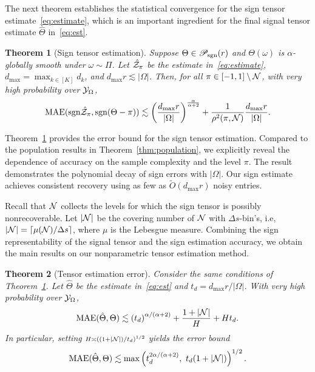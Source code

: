 \documentclass[useAMS,usenatbib,usegraphicx,referee]{biom}
\theoremstyle{plain}
\newtheorem{thm}{Theorem}
\theoremstyle{definition}
\def\sign{\textup{sgn}}
\def\caliP{\mathscr{P}_{\textup{sgn}}}
\begin{document}
The next theorem establishes the statistical convergence for the sign tensor estimate~\eqref{eq:estimate}, which is an important ingredient for the final signal tensor estimate $\hat \Theta$ in~\eqref{eq:est}. 

\vspace{-.3cm}
 \begin{thm}[Sign tensor estimation]\label{thm:classification} Suppose $\Theta\in\caliP(r)$ and $\Theta(\omega)$ is $\alpha$-globally smooth under $\omega\sim \Pi$. Let $\hat {\mathcal{Z}}_\pi$ be the estimate in~\eqref{eq:estimate}, $d_{\max}=\max_{k\in[K]} d_k$, and $d_{\max}r\lesssim |\Omega|$. Then, for all $\pi\in[-1,1]\setminus\mathcal{N}$, with very high probability over $\mathcal{Y}_\Omega$, 
\begin{align}\label{eq:bound}
\textup{MAE}(\sign \hat \tZ_\pi, \sign(\Theta-\pi)) \lesssim  \left({d_{\max} r\over |\Omega|}\right)^{\alpha\over \alpha+2}+{1 \over \rho^2(\pi, \tN)} {d_{\max}r \over |\Omega|}.
\end{align}
\end{thm}
Theorem~\ref{thm:classification} provides the error bound for the sign tensor estimation. Compared to the population results in Theorem~\ref{thm:population}, we explicitly reveal the dependence of accuracy on the sample complexity and the level $\pi$. The result demonstrates the polynomial decay of sign errors with $|\Omega|$.  Our sign estimate achieves consistent recovery using as few as $\tilde O(d_{\max}r)$ noisy entries. 

Recall that $\mathcal{N}$ collects the levels for which the sign tensor is possibly nonrecoverable. Let $|\mathcal{N}|$ be the covering number of $\mathcal{N}$ with $\Delta s$-bin's, i.e, $|\mathcal{N}| = \lceil \mu(\mathcal{N})/\Delta s \rceil$, where $\mu$ is the Lebesgue measure. Combining the sign representability of the signal tensor and the sign estimation accuracy, we obtain the main results on our nonparametric tensor estimation method. 

\vspace{-.3cm}

\begin{thm}[Tensor estimation error]\label{thm:estimation} Consider the same conditions of Theorem~\ref{thm:classification}. Let $\hat \Theta$ be the estimate in~\eqref{eq:est} and $t_d={d_{\max}r /|\Omega|}$. With very high probability over $\mathcal{Y}_\Omega$,
\begin{equation}\label{eq:bound2}
\textup{MAE}(\hat \Theta, \Theta)\lesssim \left(t_d\right)^{\alpha/(\alpha+2)}+{1+|\tN|\over H}+{Ht_d}.
\end{equation}
In particular, setting $\scriptstyle H\asymp \left( (1+|\mathcal{N}|)/ t_d \right)^{1/2}$ yields the error bound
\begin{equation}\label{eq:real}
\textup{MAE}(\hat \Theta, \Theta)\lesssim \max\left(t_d^{{2\alpha/ (\alpha+2)} },\ t_d(1+|\tN|)\right)^{1/2}.
\end{equation}
\end{thm}
\end{document}
